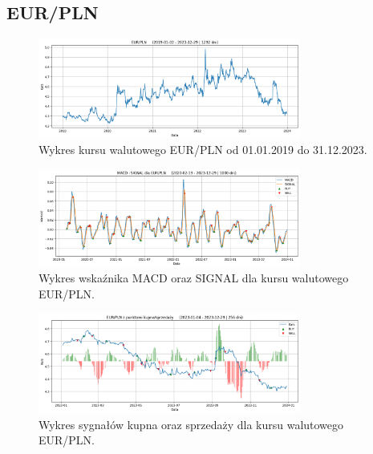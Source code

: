 \documentclass[12pt, a4paper]{article}
\begin{document}
\pagebreak







\subsection{EUR/PLN}

\begin{figure}[ht]
    \centering
    \includegraphics[width=0.77\textwidth]{eur_pln_value.png}
    \caption{Wykres kursu walutowego EUR/PLN od 01.01.2019 do 31.12.2023.}
    \label{fig:all:eur_pln_value}
\end{figure}
\begin{figure}[ht]
    \centering
    \includegraphics[width=0.77\textwidth]{eur_pln_macd_signal.png}
    \caption{Wykres wskaźnika MACD oraz SIGNAL dla kursu walutowego EUR/PLN.}
    \label{fig:all:eur_pln_macd_signal}
\end{figure}
\begin{figure}[ht]
    \centering
    \includegraphics[width=0.77\textwidth]{eur_pln_value_buy_sell.png}
    \caption{Wykres sygnałów kupna oraz sprzedaży dla kursu walutowego EUR/PLN.}
    \label{fig:all:eur_pln_value_buy_sell}
\end{figure}
\end{document}
